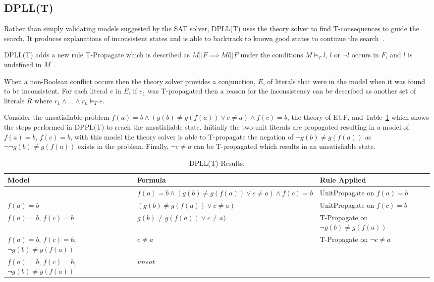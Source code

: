 \documentclass[]{final_report}
\begin{document}
\subsection{DPLL(T)}
Rather than simply validating models suggested by the SAT solver, DPLL(T) uses the theory solver to find T-consequences to guide the search. It produces explanations of inconsistent states and is able to backtrack to known good states to continue the search~\cite{smtdpplt, ganzinger2004dpll}.

DPLL(T) adds a new rule T-Propagate which is described as $M || F \implies M l || F $ under the conditions $M \models _T l$, $l$ or $\lnot l$ occurs in $F$, and $l$ is undefined in $M$~\cite{sattosmt}.

When a non-Boolean conflict occurs then the theory solver provides a conjunction, $E$, of literals that were in the model when it was found to be inconsistent. For each literal $e $ in $E$, if $e_1$ was T-propagated then a reason for the inconsistency can be described as another set of literals $R$ where $r_1 \land ... \land r_n \models _T e$. 

Consider the unsatisfiable problem $f(a) = b \land (g(b) \neq g(f(a)) \lor c \neq a) \land f(c) = b$, the theory of EUF, and Table~\ref{table:dpll-t-results} which shows the steps performed in DPPL(T) to reach the unsatisfiable state. Initially the two unit literals are propagated resulting in a model of $f(a) = b$, $f(c) = b$, with this model the theory solver is able to T-propagate the negation of $\lnot{g(b) \neq g(f(a))}$ as $\lnot{\lnot{g(b) \neq g(f(a))}}$ exists in the problem. Finally, $\lnot{c \neq a}$ can be T-propagated which results in an unsatisfiable state.


\begin{table}[t]
\centering
\begin{tabular}{|p{4.5cm}|p{6.5cm}|p{3cm}|}
\hline
Model & Formula & Rule Applied \\ \hline
{} & $f(a) = b \land (g(b) \neq g(f(a)) \lor c \neq a) \land f(c) = b$ & UnitPropagate on $f(a) = b$  \\ \hline
{$f(a) = b$ } & $(g(b) \neq g(f(a)) \lor c \neq a)$ & UnitPropagate on $ f(c) = b$   \\ \hline
{$f(a) = b$, $f(c) = b$ } & $g(b) \neq g(f(a)) \lor c \neq a)$ & T-Propagate on $\lnot{g(b) \neq g(f(a))}$   \\ \hline
{$f(a) = b$, $f(c) = b$, $\lnot{g(b) \neq g(f(a))}$ } & $c \neq a$ & T-Propagate on $\lnot{c \neq a}$   \\ \hline
{$f(a) = b$, $f(c) = b$, $\lnot{g(b) \neq g(f(a))}$ } & $unsat$ &    \\ \hline
\end{tabular}
\caption{DPLL(T) Results.}
\label{table:dpll-t-results}
\end{table}
\end{document}
